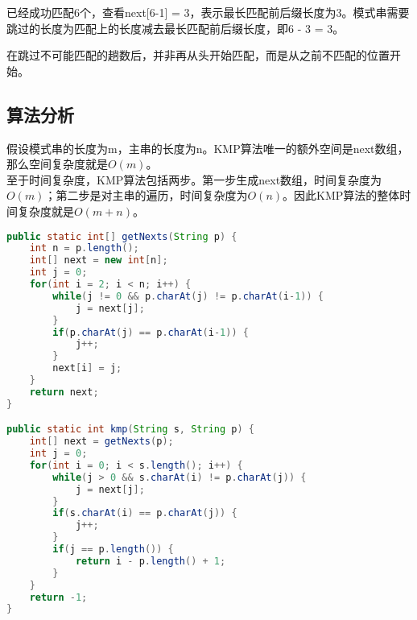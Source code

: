 已经成功匹配6个，查看next[6-1] = 3，表示最长匹配前后缀长度为3。模式串需要跳过的长度为匹配上的长度减去最长匹配前后缀长度，即6 - 3 = 3。

\begin{table}[H]
	\centering
\end{table}

在跳过不可能匹配的趟数后，并非再从头开始匹配，而是从之前不匹配的位置开始。\\

\subsection{算法分析}

假设模式串的长度为m，主串的长度为n。KMP算法唯一的额外空间是next数组，那么空间复杂度就是$ O(m) $。\\

至于时间复杂度，KMP算法包括两步。第一步生成next数组，时间复杂度为$ O(m) $；第二步是对主串的遍历，时间复杂度为$ O(n) $。因此KMP算法的整体时间复杂度就是$ O(m + n) $。\\


\begin{lstlisting}[language=Java]
public static int[] getNexts(String p) {
	int n = p.length();
	int[] next = new int[n];
	int j = 0;
	for(int i = 2; i < n; i++) {
		while(j != 0 && p.charAt(j) != p.charAt(i-1)) {
			j = next[j];
		}
		if(p.charAt(j) == p.charAt(i-1)) {
			j++;
		}
		next[i] = j;
	}
	return next;
}

public static int kmp(String s, String p) {
	int[] next = getNexts(p);
	int j = 0;
	for(int i = 0; i < s.length(); i++) {
		while(j > 0 && s.charAt(i) != p.charAt(j)) {
			j = next[j];
		}
		if(s.charAt(i) == p.charAt(j)) {
			j++;
		}
		if(j == p.length()) {
			return i - p.length() + 1;
		}
	}
	return -1;
}
\end{lstlisting}

\newpage